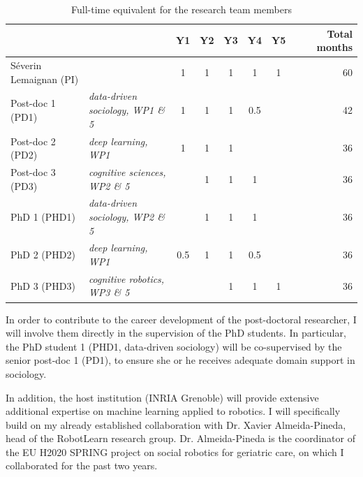 \begin{table}[h!]
    \centering
\begin{tabular}{@{}llccccccr@{}}
\toprule
    \textit{\textbf{}}     &       & \textbf{Y1} & \textbf{Y2} & \textbf{Y3} & \textbf{Y4} & \textbf{Y5} &  & \textbf{Total months} \\ \midrule
    Séverin Lemaignan (PI) &                                           & 1    & 1    & 1    & 1   & 1    &  & 60                    \\ \midrule
    Post-doc 1 (PD1)       & \textit{data-driven sociology, WP1 \& 5}  & 1    & 1    & 1    & 0.5 &      &  & 42                    \\
    Post-doc 2 (PD2)       & \textit{deep learning, WP1}               & 1    & 1    & 1    &     &      &  & 36                    \\
    Post-doc 3 (PD3)       & \textit{cognitive sciences, WP2 \& 5}     &      & 1    & 1    & 1   &      &  & 36                    \\ \midrule
    PhD 1 (PHD1)           & \textit{data-driven sociology, WP2 \& 5}  &      & 1    & 1    & 1   &      &  & 36                    \\
    PhD 2 (PHD2)           & \textit{deep learning, WP1}               & 0.5  & 1    & 1    & 0.5 &      &  & 36                    \\ 
    PhD 3 (PHD3)           & \textit{cognitive robotics, WP3 \& 5}     &      &      & 1    & 1   & 1    &  & 36                    \\ \bottomrule
\end{tabular}
    \caption{Full-time equivalent for the research team members}
    \label{time-allocation-team}
\end{table}

In order to contribute to the career development of the post-doctoral
researcher, I will involve them directly in the supervision of the PhD
students. In particular, the PhD student 1 (PHD1, data-driven sociology) will
be co-supervised by the senior post-doc 1 (PD1), to ensure she or he receives
adequate domain support in sociology.

In addition, the host institution (INRIA Grenoble) will provide extensive
additional expertise on machine learning applied to robotics. I will specifically build on
my already established collaboration with Dr. Xavier Almeida-Pineda, head of the
RobotLearn research group. Dr. Almeida-Pineda is the coordinator of the EU H2020
SPRING project on social robotics for geriatric care, on which I collaborated
for the past two years.

